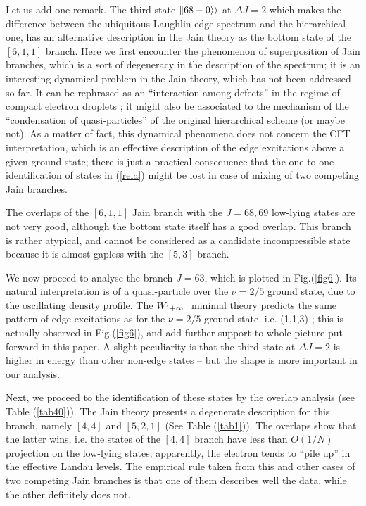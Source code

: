Let us add one remark. The third state $\Vert 68-0\rangle\rangle$ at $\Delta J=2$ 
which makes the 
difference between the ubiquitous Laughlin edge spectrum and the
hierarchical one, has an alternative description in the Jain theory
as the bottom state of the $[6,1,1]$ branch.
Here we first encounter the phenomenon of superposition of Jain branches,
which is a sort of degeneracy in the description of the spectrum;
it is an interesting dynamical problem in the Jain theory,
which has not been addressed so far. It can be rephrased as
an ``interaction among defects'' in the regime of compact electron
droplets \cite{jain}; it might also be associated to the mechanism
of the ``condensation of quasi-particles'' of the original hierarchical scheme
\cite{hiera} (or maybe not).
As a matter of fact, this dynamical phenomena does not concern the
CFT interpretation, which is an effective description of the edge 
excitations above a given ground state;
there is just a practical consequence that the one-to-one identification
of states in (\ref{rela}) might be lost in case of mixing of
two competing Jain branches.

The overlaps of the $[6,1,1]$ Jain branch with the
$J=68,69$ low-lying states are not very good, although the bottom
state itself has a good overlap. This branch is rather atypical,
and cannot be considered as a candidate incompressible state
because it is almost gapless with the $[5,3]$ branch.

We now proceed to analyse the branch $J=63$, which is
plotted in Fig.(\ref{fig6}). Its natural interpretation is
of a quasi-particle over the $\nu=2/5$ ground state, 
due to the oscillating density profile. 
The $W_{1+\infty}\ $ minimal theory predicts the same pattern of edge 
excitations as for the $\nu=2/5$ ground state, i.e. (1,1,3) \cite{ctz5};
this is actually observed in Fig.(\ref{fig6}), and add
further support to whole picture put forward in this paper.
A slight peculiarity is that the third state at $\Delta J=2$ is
higher in energy than other non-edge states -- but the shape is more
important in our analysis.

Next, we proceed to the identification of these states by the
overlap analysis (see Table (\ref{tab40})).
The Jain theory presents a degenerate description for
this branch, namely $[4,4]$ and $[5,2,1]$ (See Table (\ref{tab1})).
The overlaps show that the latter wins, i.e. 
the states of the $[4,4]$ branch have less than $O(1/N)$ projection
on the low-lying states; apparently, the electron tends to 
``pile up'' in the effective Landau levels.
The empirical rule taken from this and other cases of two competing 
Jain branches is that one of them describes well the data,
while the other definitely does not. 

